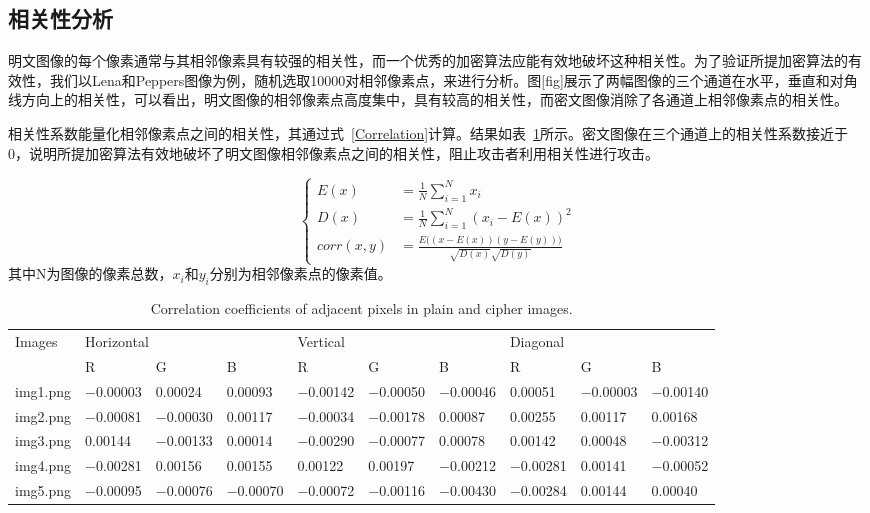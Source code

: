 \subsection{相关性分析}
明文图像的每个像素通常与其相邻像素具有较强的相关性，而一个优秀的加密算法应能有效地破坏这种相关性。为了验证所提加密算法的有效性，我们以Lena和Peppers图像为例，随机选取10000对相邻像素点，来进行分析。图[fig]展示了两幅图像的三个通道在水平，垂直和对角线方向上的相关性，可以看出，明文图像的相邻像素点高度集中，具有较高的相关性，而密文图像消除了各通道上相邻像素点的相关性。

相关性系数能量化相邻像素点之间的相关性，其通过式~\eqref{Correlation}计算。结果如表~\ref{tab:correlation_coefficients}所示。密文图像在三个通道上的相关性系数接近于0，说明所提加密算法有效地破坏了明文图像相邻像素点之间的相关性，阻止攻击者利用相关性进行攻击。

\begin{equation}
\label{Correlation}
\left\{
\begin{aligned}
E(x) &= \frac{1}{N} \sum_{i=1}^{N} x_i \\[6pt]
D(x) &= \frac{1}{N} \sum_{i=1}^{N} (x_i - E(x))^2 \\[6pt]
\mathit{corr}(x,y) &= \frac{E\big((x - E(x))(y - E(y))\big)}{\sqrt{D(x)} \sqrt{D(y)}}
\end{aligned}
\right.
\end{equation}
其中N为图像的像素总数，$x_i$和$y_i$分别为相邻像素点的像素值。


\begin{table}[htbp]
\captionsetup{singlelinecheck=false, justification=raggedright}
\caption{Correlation coefficients of adjacent pixels in plain and cipher images.}
\label{tab:correlation_coefficients}
\small
\setlength{\tabcolsep}{3.8pt} %
\begin{tabular*}{\textwidth}{@{\extracolsep{\fill}}llllllllll@{}}
\toprule
Images & \multicolumn{3}{l}{Horizontal} & \multicolumn{3}{l}{Vertical} & \multicolumn{3}{l}{Diagonal} \\
\cmidrule(lr){2-4} \cmidrule(lr){5-7} \cmidrule(lr){8-10}
 & R & G & B & R & G & B & R & G & B \\
\midrule
img1.png & $-$0.00003 & 0.00024 & 0.00093 & $-$0.00142 & $-$0.00050 & $-$0.00046 & 0.00051 & $-$0.00003 & $-$0.00140 \\
img2.png & $-$0.00081 & $-$0.00030 & 0.00117 & $-$0.00034 & $-$0.00178 & 0.00087 & 0.00255 & 0.00117 & 0.00168 \\
img3.png & 0.00144 & $-$0.00133 & 0.00014 & $-$0.00290 & $-$0.00077 & 0.00078 & 0.00142 & 0.00048 & $-$0.00312 \\
img4.png & $-$0.00281 & 0.00156 & 0.00155 & 0.00122 & 0.00197 & $-$0.00212 & $-$0.00281 & 0.00141 & $-$0.00052 \\
img5.png & $-$0.00095 & $-$0.00076 & $-$0.00070 & $-$0.00072 & $-$0.00116 & $-$0.00430 & $-$0.00284 & 0.00144 & 0.00040 \\
\bottomrule
\end{tabular*}
\end{table}

